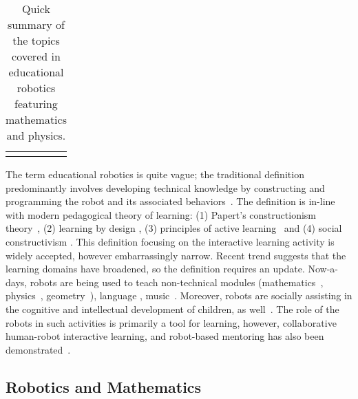 \documentclass[conference]{IEEEtran}
\begin{document}
\begin{table}[h]
\begin{tabular}{ll}
                                                                                                                         
                                                                                                                         
                                                                                &                                        
                                                                                                                         
                                                                                          
\end{tabular}
\caption{Quick summary of the topics covered in educational robotics featuring mathematics and physics.}
\label{compactEDU}
\end{table}


The term educational robotics is quite vague; the traditional definition predominantly involves developing technical 
knowledge by constructing and programming the robot and its associated behaviors~\cite{hsiu2003designing, 
barker2007robotics, balch2008designing}. The definition is in-line with modern pedagogical theory of learning: (1) 
Papert's constructionism theory~\cite{papert1980mindstorms, ackermann2001piaget}, (2) learning by design 
\cite{goldman2004using}, (3) principles of active learning~\cite{harmin2006inspiring} and (4) social constructivism 
\cite{vygotsky1980mind}. This definition focusing on the interactive learning activity is widely accepted, however 
embarrassingly narrow. Recent trend suggests that the learning domains have broadened, so the definition requires an 
update. Now-a-days, robots are being used to teach non-technical modules (mathematics~\cite{highfield2008early, 
robotmath}, physics~\cite{mitnik2008autonomous}, geometry~\cite{mitnik2008autonomous, robotmath}), language 
\cite{kanda2004interactive, han2009r}, music~\cite{han2009physical}. Moreover, robots are socially assisting in the 
cognitive and intellectual development of children, as well~\cite{mataric1999socially}. The role of the robots in such 
activities is primarily a tool for learning, however, collaborative human-robot interactive learning, and robot-based 
mentoring has also been demonstrated~\cite{mitnik2008autonomous}.

\subsection{Robotics and Mathematics}
\end{document}
